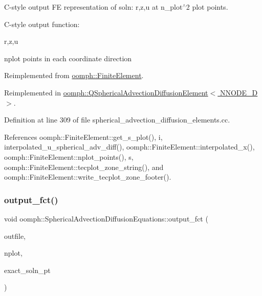 C-\/style output FE representation of soln\+: r,z,u at n\+\_\+plot$^\wedge$2 plot points. 

C-\/style output function\+:

r,z,u

nplot points in each coordinate direction 

Reimplemented from \hyperlink{classoomph_1_1FiniteElement_adfaee690bb0608f03320eeb9d110d48c}{oomph\+::\+Finite\+Element}.



Reimplemented in \hyperlink{classoomph_1_1QSphericalAdvectionDiffusionElement_a16854bbf99abd7b8512474992a29f72b}{oomph\+::\+Q\+Spherical\+Advection\+Diffusion\+Element$<$ N\+N\+O\+D\+E\+\_\+D $>$}.



Definition at line 309 of file spherical\+\_\+advection\+\_\+diffusion\+\_\+elements.\+cc.



References oomph\+::\+Finite\+Element\+::get\+\_\+s\+\_\+plot(), i, interpolated\+\_\+u\+\_\+spherical\+\_\+adv\+\_\+diff(), oomph\+::\+Finite\+Element\+::interpolated\+\_\+x(), oomph\+::\+Finite\+Element\+::nplot\+\_\+points(), s, oomph\+::\+Finite\+Element\+::tecplot\+\_\+zone\+\_\+string(), and oomph\+::\+Finite\+Element\+::write\+\_\+tecplot\+\_\+zone\+\_\+footer().

\mbox{\label{classoomph_1_1SphericalAdvectionDiffusionEquations_a2fcb664a740cfb2a645b0e1893a00773}} 
\subsubsection{\texorpdfstring{output\+\_\+fct()}{output\_fct()}}
{\footnotesize\ttfamily void oomph\+::\+Spherical\+Advection\+Diffusion\+Equations\+::output\+\_\+fct (\begin{DoxyParamCaption}\item[{std\+::ostream \&}]{outfile,  }\item[{const unsigned \&}]{nplot,  }\item[{\hyperlink{classoomph_1_1FiniteElement_a690fd33af26cc3e84f39bba6d5a85202}{Finite\+Element\+::\+Steady\+Exact\+Solution\+Fct\+Pt}}]{exact\+\_\+soln\+\_\+pt }\end{DoxyParamCaption})\hspace{0.3cm}{\ttfamily [virtual]}}



